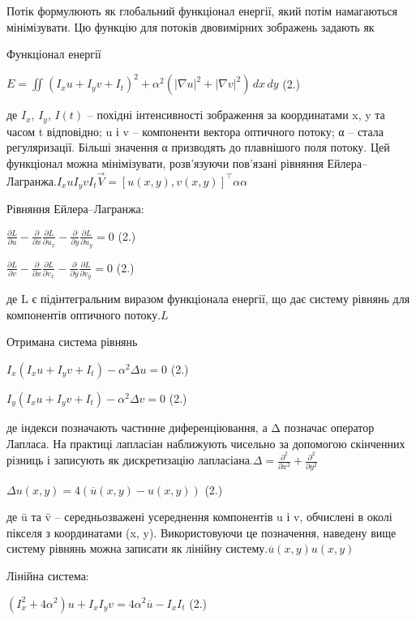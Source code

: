 \documentclass[
]{article}
\begin{document}
Потік формулюють як глобальний функціонал енергії, який потім намагаються мінімізувати. Цю функцію для потоків двовимірних зображень задають як

Функціонал енергії

\(E = \iint_{}^{}\left( I_{x}u + I_{y}v + I_{t} \right)^{2} + \alpha^{2}\left( |\nabla u|^{2} + |\nabla v|^{2} \right)\, dx\, dy\) (2.)

де \(I_{x}\), \(I_{y}\), \(I(t)\) -- похідні інтенсивності зображення за координатами x, y та часом t відповідно; u і v -- компоненти вектора оптичного потоку; α -- стала регуляризації. Більші значення α призводять до плавнішого поля потоку. Цей функціонал можна мінімізувати, розв'язуючи пов'язані рівняння Ейлера--Лагранжа.\(I_{x}uI_{y}vI_{t}\overrightarrow{V} = \left\lbrack u(x,y),v(x,y) \right\rbrack^{\top}\alpha\alpha\)

Рівняння Ейлера--Лагранжа:

\(\frac{\partial L}{\partial u} - \frac{\partial}{\partial x}\frac{\partial L}{\partial u_{x}} - \frac{\partial}{\partial y}\frac{\partial L}{\partial u_{y}} = 0\) (2.)

\(\frac{\partial L}{\partial v} - \frac{\partial}{\partial x}\frac{\partial L}{\partial v_{x}} - \frac{\partial}{\partial y}\frac{\partial L}{\partial v_{y}} = 0\) (2.)

де L є підінтегральним виразом функціонала енергії, що дає систему рівнянь для компонентів оптичного потоку.\(L\)

Отримана система рівнянь

\(I_{x}\left( I_{x}u + I_{y}v + I_{t} \right) - \alpha^{2}\Delta u = 0\) (2.)

\(I_{y}\left( I_{x}u + I_{y}v + I_{t} \right) - \alpha^{2}\Delta v = 0\) (2.)

де індекси позначають частинне диференціювання, а Δ позначає оператор Лапласа. На практиці лапласіан наближують чисельно за допомогою скінченних різниць і записують як дискретизацію лапласіана.\(\Delta = \frac{\partial^{2}}{\partial x^{2}} + \frac{\partial^{2}}{\partial y^{2}}\)

\(\Delta u(x,y) = 4\left( \overline{u}(x,y) - u(x,y) \right)\) (2.)

де ū та v̄ -- середньозважені усереднення компонентів u і v, обчислені в околі пікселя з координатами (x, y). Використовуючи це позначення, наведену вище систему рівнянь можна записати як лінійну систему.\(\overline{u}(x,y)u(x,y)\)

Лінійна система:

\(\left( I_{x}^{2} + 4\alpha^{2} \right)u + I_{x}I_{y}v = 4\alpha^{2}\overline{u} - I_{x}I_{t}\) (2.)
\end{document}

